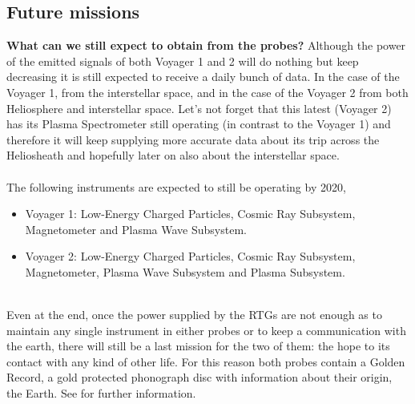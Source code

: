 \documentclass[11pt,a4paper]{article}
\begin{document}
\subsection{Future missions}
\textbf{What can we still expect to obtain from the probes?} Although the power of the emitted signals of both Voyager 1 and 2 will do nothing but keep decreasing it is still expected to receive a daily bunch of data. In the case of the Voyager 1, from the interstellar space, and in the case of the Voyager 2 from both Heliosphere and interstellar space. Let's not forget that this latest  (Voyager 2) has its Plasma Spectrometer still operating (in contrast to the Voyager 1) and therefore it will keep supplying more accurate data about its trip across the Heliosheath and hopefully later on also about the interstellar space.
\\\\
The following instruments are expected to still be operating by 2020,
\begin{itemize}
\item Voyager 1: Low-Energy Charged Particles, Cosmic Ray Subsystem, Magnetometer and Plasma Wave Subsystem.
\item Voyager 2: Low-Energy Charged Particles, Cosmic Ray Subsystem, Magnetometer, Plasma Wave Subsystem and Plasma Subsystem.
\end{itemize}
~\\
Even at the end, once the power supplied by the RTGs are not enough as to maintain any single instrument in either probes or to keep a communication with the earth, there will still be a last mission for the two of them: the hope to its contact with any kind of other life. For this reason both probes contain a Golden Record, a gold protected phonograph disc with information about their origin, the Earth. See \cite{goldenrecord} for further information.
\end{document}

